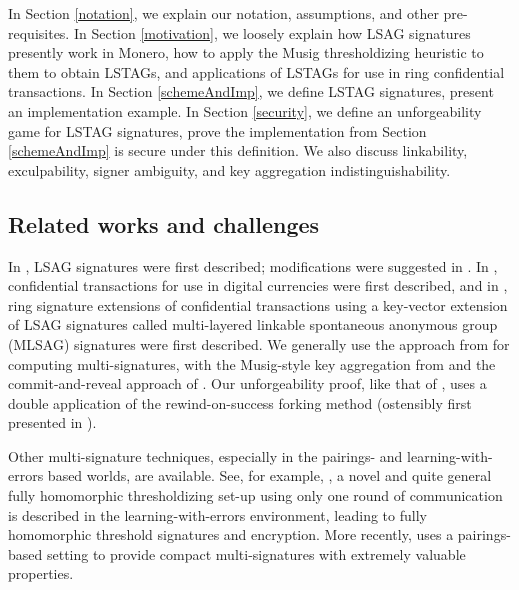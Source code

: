 \documentclass{mrl}
\theoremstyle{definition}
\numberwithin{theorem}{subsection}
\begin{document}
In Section \ref{notation}, we explain our notation, assumptions, and other pre-requisites. In Section \ref{motivation}, we loosely explain how LSAG signatures presently work in Monero, how to apply the Musig thresholdizing heuristic to them to obtain LSTAGs, and applications of LSTAGs for use in ring confidential transactions. In Section \ref{schemeAndImp}, we define LSTAG signatures, present an implementation example. In Section \ref{security}, we define an unforgeability game for LSTAG signatures, prove the implementation from Section \ref{schemeAndImp} is secure under this definition. We also discuss linkability, exculpability, signer ambiguity, and key aggregation indistinguishability. 


\subsection{Related works and challenges}

In \cite{liu2004linkable}, LSAG signatures were first described; modifications were suggested in \cite{backLSAG}.
In \cite{maxwell2015confidential}, confidential transactions for use in digital currencies were first described, and in \cite{noether2016ring}, ring signature extensions of confidential transactions using a key-vector extension of LSAG signatures called multi-layered linkable spontaneous anonymous group (MLSAG) signatures were first described. We generally use the approach from \cite{bellare2006multi} for computing multi-signatures, with the Musig-style key aggregation from \cite{qian2010non} and the commit-and-reveal approach of \cite{maxwell2018simple}. Our unforgeability proof, like that of \cite{maxwell2018simple}, uses a double application of the rewind-on-success forking method (ostensibly first presented in \cite{liu2004linkable}). 

Other multi-signature techniques, especially in the pairings- and learning-with-errors based worlds, are available. See, for example, \cite{bonehthreshold}, a novel and quite general fully homomorphic thresholdizing set-up using only one round of communication is described in the learning-with-errors environment, leading to fully homomorphic threshold signatures and encryption.  More recently, \cite{bonehcompact} uses a pairings-based setting to provide compact multi-signatures with extremely valuable properties.
\end{document}
